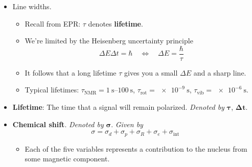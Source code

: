 \documentclass[../notes.tex]{subfiles}
\begin{document}
\begin{itemize}
\begin{itemize}
\begin{itemize}
            \item $\nu_0$ is the predicted Larmor frequency for said nucleus based on its $\gamma$.
        \end{itemize}
        \item Thus, at \SI{60}{\mega\hertz} (for example), $\SI{1}{\ppm}=\SI{60}{\hertz}$.
        \item Chemical shift lingo.
        \begin{itemize}
            \item More \emph{shielded} nuclei require \emph{higher fields}, have a \emph{lower chemical shift}, and are positioned relatively \emph{upfield}.
            \item More \emph{deshielded} nuclei resonate at \emph{lower fields}, have a \emph{higher chemical shift}, and are positioned relatively \emph{downfield}.
        \end{itemize}
    \end{itemize}
    \item Line widths.
    \begin{itemize}
        \item Recall from EPR: $\tau$ denotes \textbf{lifetime}.
        \item We're limited by the Heisenberg uncertainty principle
        \begin{equation*}
            \Delta E\Delta t = \hbar
            \quad\Longleftrightarrow\quad
            \Delta E = \frac{\hbar}{\tau}
        \end{equation*}
        \item It follows that a long lifetime $\tau$ gives you a small $\Delta E$ and a sharp line.
        \item Typical lifetimes: $\tau_\text{NMR}=\SIrange{1}{100}{\second}$, $\tau_\text{rot}=\SI{e-9}{\second}$, $\tau_\text{vib}=\SI{e-6}{\second}$.
    \end{itemize}
    \item \textbf{Lifetime}: The time that a signal will remain polarized. \emph{Denoted by} $\bm{\tau}$, $\bm{\Delta t}$.
    \item \textbf{Chemical shift}. \emph{Denoted by} $\bm{\sigma}$. \emph{Given by}
    \begin{equation*}
        \sigma = \sigma_d+\sigma_p+\sigma_R+\sigma_e+\sigma_\text{int}
    \end{equation*}
    \begin{itemize}
        \item Each of the five variables represents a contribution to the nucleus from some magnetic component.

\end{itemize}
\end{itemize}
\end{document}

